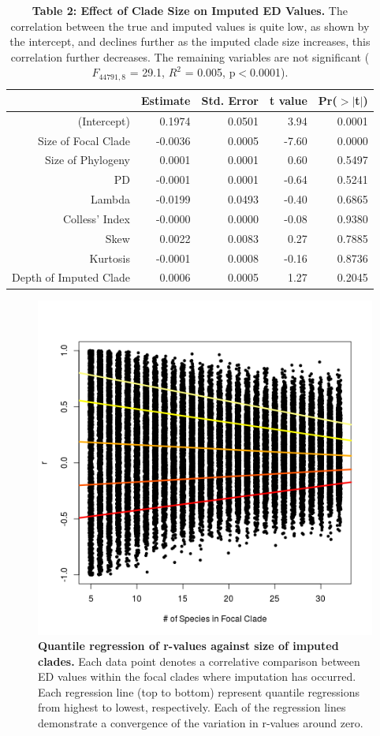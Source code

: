 \documentclass[12pt,english]{article}
\begin{document}
\begin{table}[ht] 
\centering
\begin{tabular}{rrrrr}
  \hline
  & Estimate & Std. Error & t value & Pr($>$$|$t$|$) \\
   \hline
   (Intercept) & 0.1974 & 0.0501 & 3.94 & 0.0001 \\
   Size of Focal Clade & -0.0036 & 0.0005 & -7.60 & 0.0000 \\
   Size of Phylogeny & 0.0001 & 0.0001 & 0.60 & 0.5497 \\
   PD & -0.0001 & 0.0001 & -0.64 & 0.5241 \\
   Lambda & -0.0199 & 0.0493 & -0.40 & 0.6865 \\
   Colless' Index & -0.0000 & 0.0000 & -0.08 & 0.9380 \\
   Skew & 0.0022 & 0.0083 & 0.27 & 0.7885 \\
   Kurtosis & -0.0001 & 0.0008 & -0.16 & 0.8736 \\
   Depth of Imputed Clade & 0.0006 & 0.0005 & 1.27 & 0.2045 \\
   \hline
   \hline
\end{tabular}
\caption*{\textbf{Table 2: Effect of Clade Size on Imputed ED Values.} The
correlation between the true and imputed values is quite low, as shown by the
intercept, and declines further as the imputed clade size increases, this
correlation further decreases. The remaining variables are not significant
($F_{44791, 8}$ = 29.1, $R^{2}$ = 0.005, p$<$0.0001).}
\end{table}

\begin{figure}[!ht]
  \center
  \includegraphics[width=.5\textwidth]{quantModel.png}
  \caption{\textbf{Quantile regression of r-values against size of imputed
  clades.} Each data point denotes a correlative comparison between ED values
  within the focal clades where imputation has occurred. Each regression line
  (top to bottom) represent quantile regressions from highest to lowest,
  respectively. Each of the regression lines demonstrate a convergence of the
  variation in r-values around zero.}
  \label{quantReg}
\end{figure}
\end{document}
